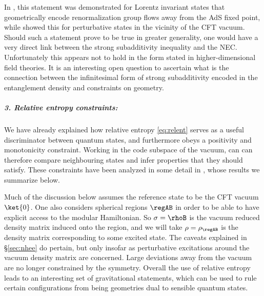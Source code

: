 \documentclass[12pt,openany]{book}
\begin{document}
In \cite{Lashkari:2014kda}, this statement was demonstrated for Lorentz invariant states that geometrically encode renormalization group flows away from the AdS fixed point, while \cite{Bhattacharya:2014vja} showed this for perturbative states in the vicinity of the CFT vacuum. Should such a statement prove to be true in greater generality, one would have a very direct link between the strong subadditivity inequality and the NEC. Unfortunately this appears not to hold in the form stated in higher-dimensional field theories. It is an interesting open question to ascertain what is the connection between the infinitesimal form of strong subadditivity encoded in the entanglement density and constraints on geometry.


\subparagraph{3. Relative entropy constraints:} We have already explained how relative entropy \eqref{eq:relent} serves as a useful discriminator between quantum states, and furthermore obeys a positivity and monotonicity constraint. Working in the code subspace of the vacuum, can can therefore compare neighbouring states and infer properties that they should satisfy. These constraints have been analyzed in some detail in \cite{Lashkari:2014kda,Lashkari:2015hha,Lashkari:2016idm}, whose results we summarize below.

Much of the discussion below assumes the reference state to be the CFT vacuum $\ket{0}$. One also considers spherical regions $\regAB$ in order to be able to have explicit access to the modular Hamiltonian. So $\sigma = \rhoB$ is the vacuum reduced density matrix induced onto the region, and we will take $\rho = \rho_{\regAB}$ is the density matrix corresponding to some  excited state.  The caveats explained in \S\ref{sec:nhee} do pertain, but only insofar as perturbative excitations around the vacuum density matrix are concerned. Large deviations away from the vacuum are no longer constrained by the symmetry. Overall the use of relative entropy leads to an interesting set of gravitational statements, which can be used to rule certain configurations from being geometries dual to sensible quantum states.
\end{document}

